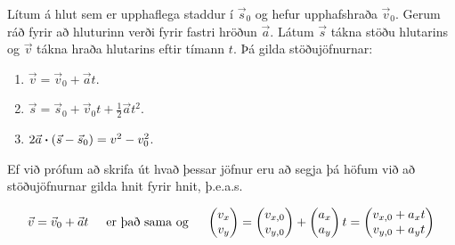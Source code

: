 \ifdefined \wholebook \else\documentclass[oneside]{book}\usepackage{EdlBook}\graphicspath{{figures/}}
\begin{document}
\begin{tcolorbox}
\begin{theorem}
Lítum á hlut sem er upphaflega staddur í $\vec{s}_0$ og hefur upphafshraða $\vec{v}_0$. Gerum ráð fyrir að hluturinn verði fyrir fastri hröðun $\vec{a}$. Látum $\vec{s}$ tákna stöðu hlutarins og $\vec{v}$ tákna hraða hlutarins eftir tímann $t$. Þá gilda stöðujöfnurnar:

\begin{enumerate}[label = \textbf{(\roman*)}]
    \item $\vec{v} = \vec{v}_0 + \vec{a}t$.

    \item $\vec{s} = \vec{s}_0 + \vec{v}_0 t + \frac{1}{2}\vec{a}t^2$.
    
    \item $2\vec{a} \vdot (\vec{s} - \vec{s}_0) = v^2 - v_0^2$.
\end{enumerate}
\end{theorem}
\end{tcolorbox}

Ef við prófum að skrifa út hvað þessar jöfnur eru að segja þá höfum við að stöðujöfnurnar gilda hnit fyrir hnit, þ.e.a.s.

\begin{align*}
    \vec{v} = \vec{v}_0 + \vec{a}t \hspace{0.5cm} \text{er það sama og} \hspace{0.5cm} \begin{pmatrix}
v_{x}\\
v_{y} \\
\end{pmatrix} = \begin{pmatrix}
v_{x,0}\\
v_{y,0} \\
\end{pmatrix} + \begin{pmatrix}
a_x\\
a_y \\
\end{pmatrix} t = \begin{pmatrix}
v_{x,0} + a_x t\\
v_{y,0} + a_y t \\
\end{pmatrix}
\end{align*}
\end{document}
